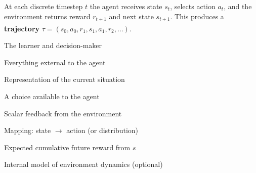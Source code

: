 \begin{tcbitemize}[ skin=sectionraster ]
        \tcbitem[title={Agent--Environment Interaction Loop}, raster multicolumn=6]
        At each discrete timestep $t$ the agent receives state $s_t$, selects
        action $a_t$, and the environment returns reward $r_{t+1}$ and next
        state $s_{t+1}$. This produces a \textbf{trajectory}
        $\tau = (s_0, a_0, r_1, s_1, a_1, r_2, \ldots)$.%
        \textsuperscript{\cite[][p.~325]{hurbansGrokkingArtificialIntelligence2020}}
        \tcblower
        \begin{center}
        \end{center}

        \tcbitem[title=Core Components, raster multicolumn=3]
        \begin{description}[leftmargin=0.5cm, labelindent=0pt]
            \item[\textbf{Agent}] The learner and decision-maker
            \item[\textbf{Environment}] Everything external to the agent
            \item[\textbf{State $s$}] Representation of the current situation
            \item[\textbf{Action $a$}] A choice available to the agent
            \item[\textbf{Reward $r$}] Scalar feedback from the environment
            \item[\textbf{Policy $\pi$}] Mapping: state $\to$ action (or distribution)
            \item[\textbf{Value $V(s)$}] Expected cumulative future reward from $s$
            \item[\textbf{Model}] Internal model of environment dynamics (optional)
        \end{description}
        \textsuperscript{\cite[][p.~326]{hurbansGrokkingArtificialIntelligence2020}}


\end{tcbitemize}
